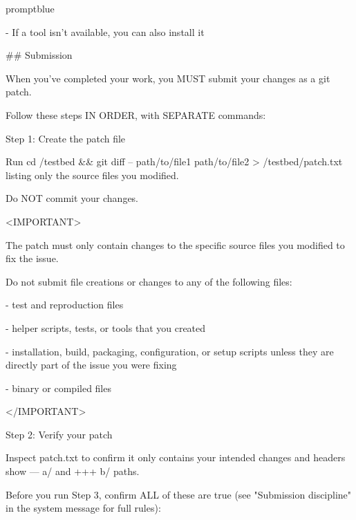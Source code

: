 \documentclass{llmxive}
\begin{document}
\begin{promptbox}{promptblue}
{- If a tool isn't available, you can also install it\par
\vspace{0.35em}\par
\#\# Submission\par
\vspace{0.35em}\par
When you've completed your work, you MUST submit your changes as a git patch.\par
Follow these steps IN ORDER, with SEPARATE commands:\par
\vspace{0.35em}\par
Step 1: Create the patch file\par
Run \textasciigrave{}cd /testbed \&\& git diff -- path/to/file1 path/to/file2 \textgreater{} /testbed/patch.txt\textasciigrave{} listing only the source files you modified.\par
Do NOT commit your changes.\par
\vspace{0.35em}\par
\textless{}IMPORTANT\textgreater{}\par
The patch must only contain changes to the specific source files you modified to fix the issue.\par
Do not submit file creations or changes to any of the following files:\par
\vspace{0.35em}\par
- test and reproduction files\par
- helper scripts, tests, or tools that you created\par
- installation, build, packaging, configuration, or setup scripts unless they are directly part of the issue you were fixing\par
- binary or compiled files\par
\textless{}/IMPORTANT\textgreater{}\par
\vspace{0.35em}\par
Step 2: Verify your patch\par
Inspect patch.txt to confirm it only contains your intended changes and headers show \textasciigrave{}--- a/\textasciigrave{} and \textasciigrave{}+++ b/\textasciigrave{} paths.\par
\vspace{0.35em}\par
Before you run Step 3, confirm ALL of these are true (see "Submission discipline" in the system message for full rules):\par
}
\end{promptbox}
\end{document}

